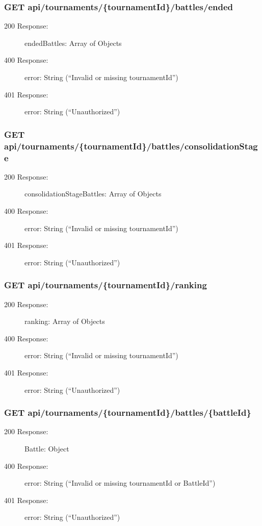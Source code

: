 \documentclass{Configuration_Files/Template}
\begin{document}
\subsubsection{GET api/tournaments/\{tournamentId\}/battles/ended}
\begin{description}
    \item[200 Response:] endedBattles: Array of Objects
    \item[400 Response:] error: String (“Invalid or missing tournamentId”)
    \item[401 Response:] error: String (“Unauthorized”)
\end{description}

\subsubsection{GET api/tournaments/\{tournamentId\}/battles/consolidationStage}
\begin{description}
    \item[200 Response:] consolidationStageBattles: Array of Objects
    \item[400 Response:] error: String (“Invalid or missing tournamentId”)
    \item[401 Response:] error: String (“Unauthorized”)
\end{description}

\subsubsection{GET api/tournaments/\{tournamentId\}/ranking}
\begin{description}
    \item[200 Response:] ranking: Array of Objects
    \item[400 Response:] error: String (“Invalid or missing tournamentId”)
    \item[401 Response:] error: String (“Unauthorized”)
\end{description}

\subsubsection{GET api/tournaments/\{tournamentId\}/battles/\{battleId\}}
\begin{description}
    \item[200 Response:] Battle: Object
    \item[400 Response:] error: String (“Invalid or missing tournamentId or BattleId”)
    \item[401 Response:] error: String (“Unauthorized”)
\end{description}
\end{document}
